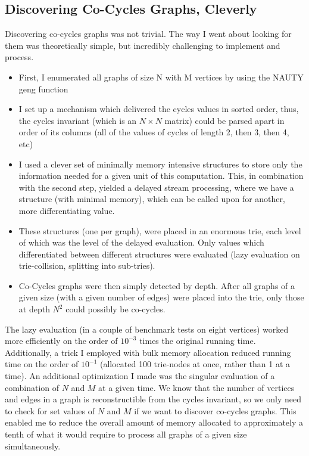 \subsection{Discovering Co-Cycles Graphs, Cleverly}

Discovering co-cycles graphs was not trivial.
The way I went about looking for them was theoretically simple, but incredibly challenging to implement and process.
\begin{itemize}
\item{First, I enumerated all graphs of size N with M vertices by using the NAUTY geng function}
\item{I set up a mechanism which delivered the cycles values in sorted order, thus, the cycles invariant (which is an $N \times N$ matrix) could be parsed apart in order of its columns (all of the values of cycles of length 2, then 3, then 4, etc)}
\item{I used a clever set of minimally memory intensive structures to store only the information needed for a given unit of this computation.  This, in combination with the second step, yielded a delayed stream processing, where we have a structure (with minimal memory), which can be called upon for another, more differentiating value.}
\item{These structures (one per graph), were placed in an enormous trie, each level of which was the level of the delayed evaluation.  Only values which differentiated between different structures were evaluated (lazy evaluation on trie-collision, splitting into sub-tries).}
\item{Co-Cycles graphs were then simply detected by depth. After all graphs of a given size (with a given number of edges) were placed into the trie, only those at depth $N^2$ could possibly be co-cycles.}
\end{itemize}

The lazy evaluation (in a couple of benchmark tests on eight vertices) worked more efficiently on the order of $10^{-3}$ times the original running time.
Additionally, a trick I employed with bulk memory allocation reduced running time on the order of $10^{-1}$ (allocated 100 trie-nodes at once, rather than 1 at a time).
An additional optimization I made was the singular evaluation of a combination of $N$ and $M$ at a given time.
We know that the number of vertices and edges in a graph is reconstructible from the cycles invariant, so we only need to check for set values of $N$ and $M$ if we want to discover co-cycles graphs.
This enabled me to reduce the overall amount of memory allocated to approximately a tenth of what it would require to process all graphs of a given size simultaneously.


